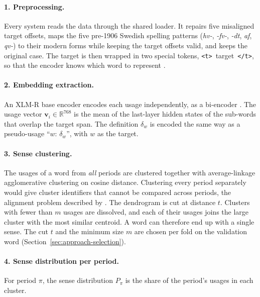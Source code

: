 \paragraph{1. Preprocessing.} Every system reads the data through the shared
loader. It repairs five misaligned target offsets, maps the five pre-1906
Swedish spelling patterns (\textit{hv-}, \textit{-fv-}, \textit{-dt},
\textit{af}, \textit{qv-}) to their modern forms while keeping the target offsets
valid, and keeps the original case. The target is then wrapped in two special
tokens, \texttt{<t>}~target~\texttt{</t>}, so that the encoder knows which word
to represent \citep{cassotti2023xllexeme}.

\paragraph{2. Embedding extraction.} An XLM-R base encoder
\citep{conneau2020xlmr} encodes each usage independently, as a bi-encoder
\citep{reimers2019sbert}. The usage vector $\mathbf{v}_i\in\mathbb{R}^{768}$ is
the mean of the last-layer hidden states of the sub-words that overlap the
target span. The definition $\delta_w$ is encoded the same way as a
pseudo-usage ``$w$: $\delta_w$'', with $w$ as the target.

\paragraph{3. Sense clustering.} The usages of a word from \emph{all} periods are
clustered together with average-linkage agglomerative clustering on cosine
distance. Clustering every period separately would give cluster identifiers that
cannot be compared across periods, the alignment problem described by
\citet{periti2024towards}. The dendrogram is cut at distance $t$. Clusters with
fewer than $m$ usages are dissolved, and each of their usages joins the large
cluster with the most similar centroid. A word can therefore end up with a single
sense. The cut $t$ and the minimum size $m$ are chosen per fold on the validation
word (Section~\ref{sec:approach-selection}).

\paragraph{4. Sense distribution per period.} For period $\pi$, the sense
distribution $P_\pi$ is the share of the period's usages in each cluster.

